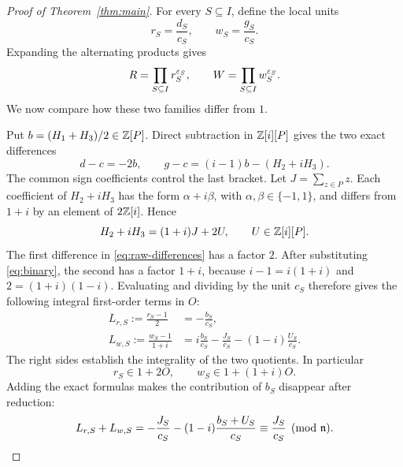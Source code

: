 \begin{proof}[Proof of Theorem~\ref{thm:main}]
For every \(S\subseteq I\), define the local units
\begin{equation}\label{eq:ratios}
 r_S=\frac{d_S}{c_S},\qquad w_S=\frac{g_S}{c_S}.
\end{equation}
Expanding the alternating products gives
\begin{equation}\label{eq:ratio-products}
 R=\prod_{S\subseteq I}r_S^{\varepsilon_S},\qquad
 W=\prod_{S\subseteq I}w_S^{\varepsilon_S}.
\end{equation}
We now compare how these two families differ from \(1\).

Put \(b=(H_1+H_3)/2\in\mathbb Z[P]\). Direct subtraction in
\(\mathbb Z[i][P]\) gives the two exact differences
\begin{equation}\label{eq:raw-differences}
 d-c=-2b,\qquad
 g-c=(i-1)b-(H_2+iH_3).
\end{equation}
The common sign coefficients control the last bracket. Let
\(J=\sum_{z\in P}z\). Each coefficient of \(H_2+iH_3\) has the form
\(\alpha+i\beta\), with \(\alpha,\beta\in\{-1,1\}\), and differs
from \(1+i\) by an element of \(2\mathbb Z[i]\). Hence
\begin{equation}\label{eq:binary}
 H_2+iH_3=(1+i)J+2U,\qquad U\in\mathbb Z[i][P].
\end{equation}
The first difference in \eqref{eq:raw-differences} has a factor \(2\).
After substituting \eqref{eq:binary}, the second has a factor \(1+i\),
because \(i-1=i(1+i)\) and \(2=(1+i)(1-i)\).
Evaluating and dividing by the unit \(c_S\) therefore gives the
following integral first-order terms in \(O\):
\begin{align}
 L_{r,S}:=\frac{r_S-1}{2}
   &=-\frac{b_S}{c_S},\label{eq:lr}\\
 L_{w,S}:=\frac{w_S-1}{1+i}
   &=i\frac{b_S}{c_S}-\frac{J_S}{c_S}
     -(1-i)\frac{U_S}{c_S}.\label{eq:lw}
\end{align}
The right sides establish the integrality of the two quotients.
In particular
\[
 r_S\in1+2O,\qquad w_S\in1+(1+i)O.
\]
Adding the exact formulas makes the contribution of \(b_S\) disappear
after reduction:
\begin{equation}\label{eq:sum-first-order}
 L_{r,S}+L_{w,S}
 =-\frac{J_S}{c_S}-(1-i)\frac{b_S+U_S}{c_S}
 \equiv\frac{J_S}{c_S}\pmod{\mathfrak n}.
\end{equation}


\end{proof}
